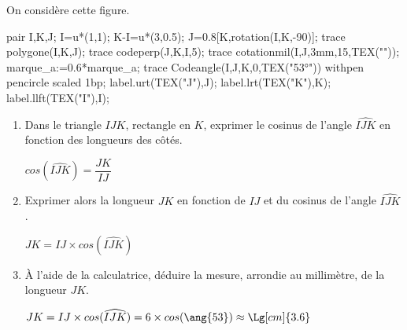     On considère cette figure.

    \begin{Geometrie}
        pair I,K,J;
        I=u*(1,1);
        K-I=u*(3,0.5);
        J=0.8[K,rotation(I,K,-90)];
        trace polygone(I,K,J);
        trace codeperp(J,K,I,5);
        trace cotationmil(I,J,3mm,15,TEX(""));
        marque_a:=0.6*marque_a;
        trace Codeangle(I,J,K,0,TEX("\ang{53}")) withpen pencircle scaled 1bp;
        label.urt(TEX("J"),J);
        label.lrt(TEX("K"),K);
        label.llft(TEX("I"),I);
    \end{Geometrie}

    \begin{enumerate}
        \item Dans le triangle $IJK$, rectangle en $K$, exprimer le cosinus de l'angle $\widehat{IJK}$ en fonction des longueurs des côtés.

        {\color{red} $cos(\widehat{IJK})=\dfrac{JK}{IJ}$}
        \item Exprimer alors la longueur $JK$ en fonction de $IJ$ et du cosinus de l'angle $\widehat{IJK}$.

        {\color{red} $JK=IJ\times cos(\widehat{IJK})$}
        \item À l'aide de la calculatrice, déduire la mesure, arrondie au millimètre, de la longueur $JK$.

        {\color{red} $JK=IJ\times cos(\widehat{IJK})=6\times cos(\ang{53})\approx\Lg[cm]{3.6}$}
    \end{enumerate}
